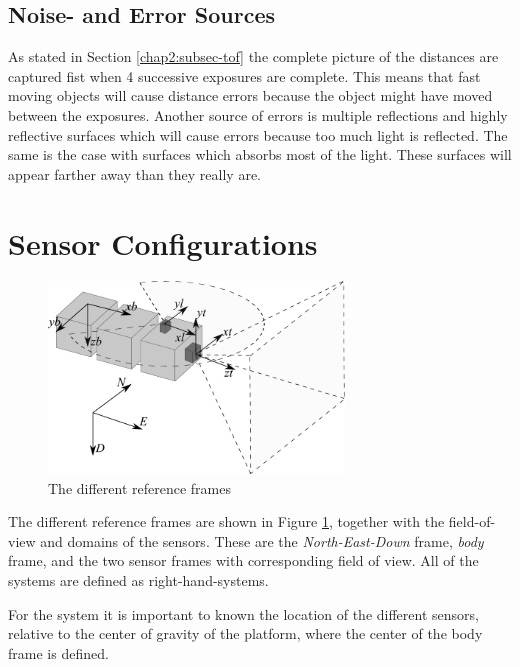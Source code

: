 \subsection{Noise- and Error Sources}
As stated in Section \ref{chap2:subsec-tof} the complete picture of the distances are
captured fist when 4 successive exposures are complete. This means that fast moving
objects will cause distance errors because the object might have moved between the
exposures. Another source of errors is multiple reflections and highly reflective
surfaces which will cause errors because too much light is reflected. The same is the case
with surfaces which absorbs most of the light. These surfaces will appear farther away than
they really are. 


\section{Sensor Configurations}
\label{chap3:sec-sensorconfig}
\begin{figure}[htbp]
    \centering
    \includegraphics[width=0.7\textwidth]{pics/sensor-config}
    \caption{The different reference frames}
    \label{chap3:fig-sensor-frames}
\end{figure}
The different reference frames are shown in Figure \ref{chap3:fig-sensor-frames}, together
with the field-of-view and domains of the sensors. These are the
\emph{North-East-Down} frame, \emph{body} frame, and the two sensor frames with
corresponding field of view. All of the systems are defined as right-hand-systems. 

For the system it is important to known the location of the different sensors, relative to
the center of gravity of the platform, where the center of the body frame is 
defined. 


